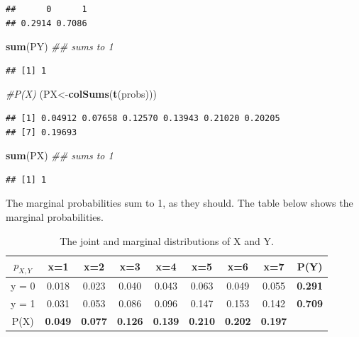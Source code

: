 \documentclass[12pt,]{krantz}
\newenvironment{Shaded}{\begin{snugshade}}{\end{snugshade}}
\newcommand{\CommentTok}[1]{\textcolor[rgb]{0.56,0.35,0.01}{\textit{#1}}}
\newcommand{\KeywordTok}[1]{\textcolor[rgb]{0.13,0.29,0.53}{\textbf{#1}}}
\newcommand{\NormalTok}[1]{#1}
\begin{document}
\begin{verbatim}
##      0      1 
## 0.2914 0.7086
\end{verbatim}

\begin{Shaded}
\begin{Highlighting}[]
\KeywordTok{sum}\NormalTok{(PY) }\CommentTok{## sums to 1}
\end{Highlighting}
\end{Shaded}

\begin{verbatim}
## [1] 1
\end{verbatim}

\begin{Shaded}
\begin{Highlighting}[]
\CommentTok{#P(X)}
\NormalTok{(PX<-}\KeywordTok{colSums}\NormalTok{(}\KeywordTok{t}\NormalTok{(probs)))}
\end{Highlighting}
\end{Shaded}

\begin{verbatim}
## [1] 0.04912 0.07658 0.12570 0.13943 0.21020 0.20205
## [7] 0.19693
\end{verbatim}

\begin{Shaded}
\begin{Highlighting}[]
\KeywordTok{sum}\NormalTok{(PX) }\CommentTok{## sums to 1}
\end{Highlighting}
\end{Shaded}

\begin{verbatim}
## [1] 1
\end{verbatim}

The marginal probabilities sum to 1, as they should. The table below shows the marginal probabilities.

\small
\begin{table}[!htbp]
\begin{center}
\begin{tabular}{c|ccccccc|c}
$p_{X,Y}$ & x=1 & x=2 & x=3 & x=4 & x=5 & x=6 & x=7 & P(Y)\\
\hline
y = 0 & 0.018 & 0.023 & 0.040 & 0.043 & 0.063 & 0.049 & 0.055 &  \textbf{0.291}\\
y = 1 & 0.031 & 0.053 & 0.086 & 0.096 &  0.147 & 0.153 &  0.142 &  \textbf{0.709}\\
\hline
P(X) & \textbf{0.049} & \textbf{0.077} & \textbf{0.126} & \textbf{0.139} & \textbf{0.210} & \textbf{0.202} & \textbf{0.197}\\
\end{tabular}
\end{center}
\caption{The joint and marginal distributions of X and Y.}\label{discretebivartable2}
\end{table}
\normalsize
\end{document}
